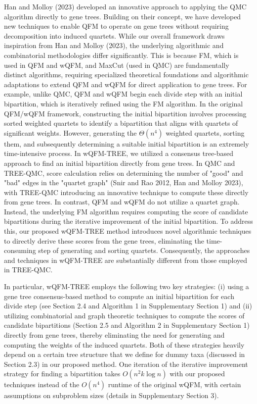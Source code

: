 \documentclass[11pt]{article}
\begin{document}
Han and Molloy (2023) developed an innovative approach to applying the QMC algorithm directly to gene trees. Building on their concept, we have developed new techniques to enable QFM to operate on gene trees without requiring decomposition into induced quartets. While our overall framework draws inspiration from Han and Molloy (2023), the underlying algorithmic and combinatorial methodologies differ significantly. This is because FM, which is used in QFM and wQFM, and MaxCut (used in QMC) are fundamentally distinct algorithms, requiring specialized theoretical foundations and algorithmic adaptations to extend QFM and wQFM for direct application to gene trees. For example, unlike QMC, QFM and wQFM begin each divide step with an initial bipartition, which is iteratively refined using the FM algorithm. In the original QFM/wQFM framework, constructing the initial bipartition involves processing sorted weighted quartets to identify a bipartition that aligns with quartets of significant weights. However, generating the $\Theta(n^4)$ weighted quartets, sorting them, and subsequently determining a suitable initial bipartition is an extremely time-intensive process. In wQFM-TREE, we utilized a consensus tree-based approach to find an initial bipartition directly from gene trees. In QMC and TREE-QMC, score calculation relies on determining the number of "good" and "bad" edges in the "quartet graph" (Snir and Rao 2012, Han and Molloy 2023), with TREE-QMC introducing an innovative technique to compute these directly from gene trees. In contrast, QFM and wQFM do not utilize a quartet graph. Instead, the underlying FM algorithm requires computing the score of candidate bipartitions during the iterative improvement of the initial bipartition. To address this, our proposed wQFM-TREE method introduces novel algorithmic techniques to directly derive these scores from the gene trees, eliminating the time-consuming step of generating and sorting quartets. Consequently, the approaches and techniques in wQFM-TREE are substantially different from those employed in TREE-QMC.

In particular, wQFM-TREE employs the following two key strategies: (i) using a gene tree consensus-based method to compute an initial bipartition for each divide step (see Section 2.4 and Algorithm 1 in Supplementary Section 1) and (ii) utilizing combinatorial and graph theoretic techniques to compute the scores of candidate bipartitions (Section 2.5 and Algorithm 2 in Supplementary Section 1) directly from gene trees, thereby eliminating the need for generating and computing the weights of the induced quartets. Both of these strategies heavily depend on a certain tree structure that we define for dummy taxa (discussed in Section 2.3) in our proposed method. One iteration of the iterative improvement strategy for finding a bipartition takes $O(n^2 k \log n)$ with our proposed techniques instead of the $O(n^4)$ runtime of the original wQFM, with certain assumptions on subproblem sizes (details in Supplementary Section 3).
\end{document}
